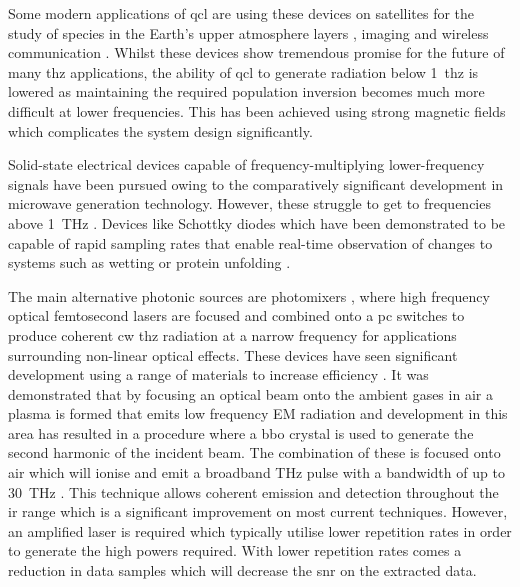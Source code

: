 Some modern applications of \acrshort{qcl} are using these devices on satellites for the study of species in the Earth's upper atmosphere layers \cite{Swinyard2016}, imaging \cite{Dean2014} and wireless communication \cite{Chen2011}. Whilst these devices show tremendous promise for the future of many \acrshort{thz} applications, the ability of \acrshort{qcl} to generate radiation below \SI{1}{\acrshort{thz}} is lowered as maintaining the required population inversion becomes much more difficult at lower frequencies. This has been achieved using strong magnetic fields \cite{Wade2008} which complicates the system design significantly.

Solid\nobreakdash-state electrical devices capable of frequency\nobreakdash-multiplying lower\nobreakdash-frequency signals have been pursued owing to the comparatively significant development in microwave generation technology. However, these struggle to get to frequencies above \SI{1}{THz} \cite{Kinev2021}. Devices like Schottky diodes which have been demonstrated to be capable of rapid sampling rates that enable real\nobreakdash-time observation of changes to systems such as wetting or protein unfolding \cite{Rettich2015}.

The main alternative photonic sources are photomixers \cite{McIntosh1995}, where high frequency optical femtosecond lasers are focused and combined onto a \acrshort{pc} switches to produce coherent \acrshort{cw} \acrshort{thz} radiation at a narrow frequency for applications surrounding non-linear optical effects. These devices have seen significant development using a range of materials to increase efficiency \cite{AlMuhadar2022}.
It was demonstrated that by focusing an optical beam onto the ambient gases in air a plasma is formed that emits low frequency EM radiation \cite{Hamster1993} and development in this area has resulted in a procedure where a \acrfull{bbo} crystal is used to generate the second harmonic of the incident beam. The combination of these is focused onto air which will ionise and emit a broadband THz pulse with a bandwidth of up to \SI{30}{THz} \cite{Dai2011}. This technique allows coherent emission and detection throughout the \acrshort{ir} range which is a significant improvement on most current techniques. However, an amplified laser is required which typically utilise lower repetition rates in order to generate the high powers required. With lower repetition rates comes a reduction in data samples which will decrease the \acrshort{snr} on the extracted data.

